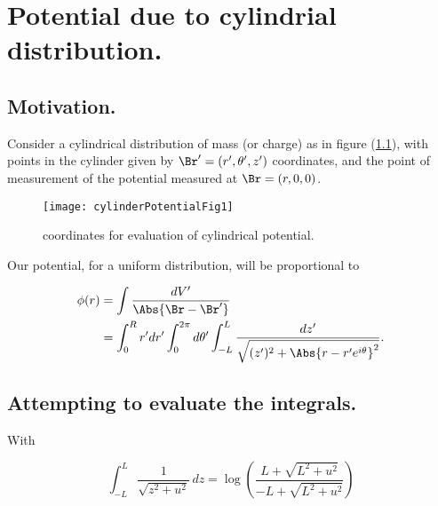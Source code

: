 
%

\chapter{Potential due to cylindrial distribution.}
\label{chap:cylinderPotential}
{}
\date{Feb 27, 2012}

\beginArtWithToc

\section{Motivation.}

Consider a cylindrical distribution of mass (or charge) as in figure (\ref{fig:cylinderPotential:cylinderPotentialFig1}), with points in the cylinder given  by $\Br' = (r', \theta ', z')$ coordinates, and the point of measurement of the potential measured at $\Br = (r, 0, 0)$.

\begin{figure}[htp]
   \centering
   \texttt{[image: cylinderPotentialFig1]}
   \caption{coordinates for evaluation of cylindrical potential.}\label{fig:cylinderPotential:cylinderPotentialFig1}
\end{figure}

Our potential, for a uniform distribution, will be proportional to

\begin{equation}\label{eqn:cylinderPotential:10}
\begin{aligned}
\phi(r) 
&= \int \frac{ dV'}{\Abs{\Br - \Br'}} \\
&=
\int_0^R r' dr' \int_0^{2 \pi } d\theta' \int_{-L}^L \frac{dz' }{\sqrt{(z')^2+ \Abs{r - r' e^{i \theta }}^2}}.
\end{aligned}
\end{equation}

\section{Attempting to evaluate the integrals.}

With

\begin{equation}\label{eqn:cylinderPotential:30}
\int_{-L}^L \frac{1}{\sqrt{z^2+u^2}} \, dz=\log \left(\frac{L+\sqrt{L^2+u^2}}{-L+\sqrt{L^2+u^2}}\right)
\end{equation}

